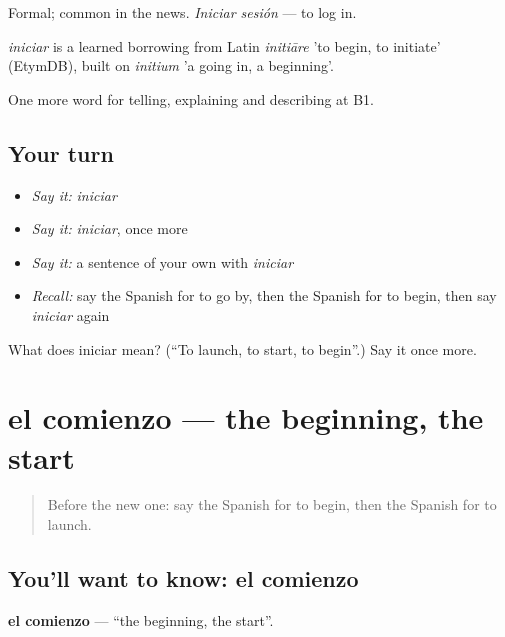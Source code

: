 Formal; common in the news. \emph{Iniciar sesión} — to log in.

\begin{cousinweb}
\emph{iniciar} is a learned borrowing from Latin \emph{initiāre} 'to begin, to initiate' (EtymDB), built on \emph{initium} 'a going in, a beginning'.
\end{cousinweb}

\begin{grammarlens}[title={What you've built}]
One more word for telling, explaining and describing at B1.
\end{grammarlens}

\subsection*{Your turn}
\begin{itemize}
\raggedright
  \item \emph{Say it:} \emph{iniciar}
  \item \emph{Say it:} \emph{iniciar}, once more
  \item \emph{Say it:} a sentence of your own with \emph{iniciar}
  \item \emph{Recall:} say the Spanish for to go by, then the Spanish for to begin, then say \emph{iniciar} again
\end{itemize}

\begin{tcolorbox}[breakable,colback=teal!4,colframe=teal!35!black,title={Before you move on}]
What does iniciar mean? (\textquotedblleft{}To launch, to start, to begin\textquotedblright{}.) Say it once more.
\end{tcolorbox}
\section[el comienzo]{el comienzo — the beginning, the start}

\label{lesson:ES-C542-comienzo}



\begin{quote}
Before the new one: say the Spanish for to begin, then the Spanish for to launch.
\end{quote}

\subsection*{You'll want to know: el comienzo}
\textbf{el comienzo} — \textquotedblleft{}the beginning, the start\textquotedblright{}.

